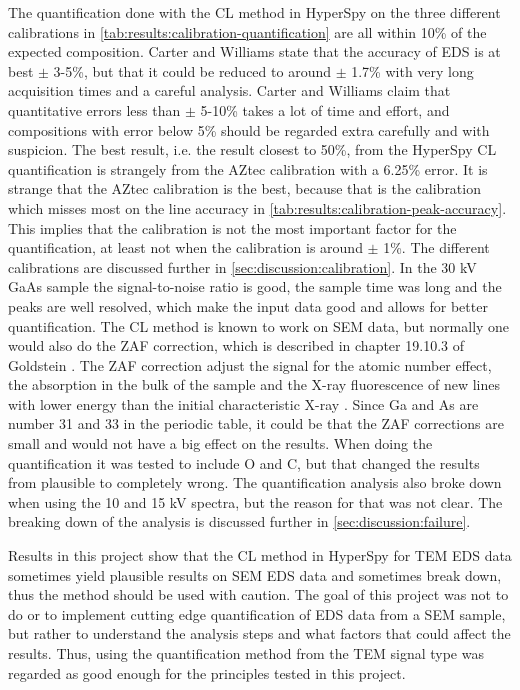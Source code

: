 The quantification done with the CL method in HyperSpy on the three different calibrations in \cref{tab:results:calibration-quantification} are all within 10\% of the expected composition.
Carter and Williams \cite[p. 612 and 648]{carter2016transmission} state that the accuracy of EDS is at best $\pm$ 3-5\%, but that it could be reduced to around $\pm$ 1.7\% with very long acquisition times and a careful analysis.
Carter and Williams claim that quantitative errors less than $\pm$ 5-10\% takes a lot of time and effort, and compositions with error below 5\% should be regarded extra carefully and with suspicion.
The best result, i.e. the result closest to 50\%, from the HyperSpy CL quantification is strangely from the AZtec calibration with a 6.25\% error.
It is strange that the AZtec calibration is the best, because that is the calibration which misses most on the line accuracy in \cref{tab:results:calibration-peak-accuracy}.
This implies that the calibration is not the most important factor for the quantification, at least not when the calibration is around $\pm$ 1\%.
The different calibrations are discussed further in \cref{sec:discussion:calibration}.
In the 30 kV GaAs sample the signal-to-noise ratio is good, the sample time was long and the peaks are well resolved, which make the input data good and allows for better quantification.
The CL method is known to work on SEM data, but normally one would also do the ZAF correction, which is described in chapter 19.10.3 of Goldstein \cite{goldstein_scanning_2018}.
The ZAF correction adjust the signal for the atomic number effect, the absorption in the bulk of the sample and the X-ray fluorescence of new lines with lower energy than the initial characteristic X-ray \cite[Sec. 19.10]{goldstein_scanning_2018}.
Since Ga and As are number 31 and 33 in the periodic table, it could be that the ZAF corrections are small and would not have a big effect on the results.
When doing the quantification it was tested to include O and C, but that changed the results from plausible to completely wrong.
The quantification analysis also broke down when using the 10 and 15 kV spectra, but the reason for that was not clear.
The breaking down of the analysis is discussed further in \cref{sec:discussion:failure}.


Results in this project show that the CL method in HyperSpy for TEM EDS data sometimes yield plausible results on SEM EDS data and sometimes break down, thus the method should be used with caution.
The goal of this project was not to do or to implement cutting edge quantification of EDS data from a SEM sample, but rather to understand the analysis steps and what factors that could affect the results.
Thus, using the quantification method from the TEM signal type was regarded as good enough for the principles tested in this project.









